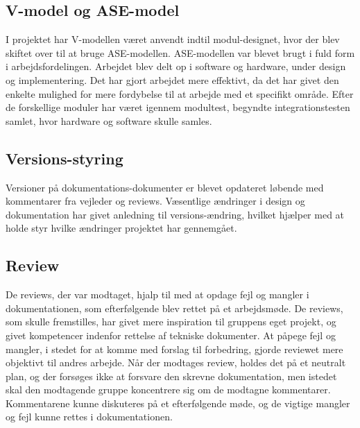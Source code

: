 \subsection{V-model og ASE-model}
I projektet har V-modellen\cite{lib:Projektoplaeg} været anvendt indtil modul-designet, hvor der blev skiftet over til at bruge ASE-modellen. 
ASE-modellen var blevet brugt i fuld form i arbejdsfordelingen. Arbejdet blev delt op i software og hardware, under design og implementering. Det har gjort arbejdet mere effektivt, da det har givet den enkelte mulighed for mere fordybelse til at arbejde med et specifikt område. Efter de forskellige moduler har været igennem modultest, begyndte integrationstesten samlet, hvor hardware og software skulle samles.

\subsection{Versions-styring}
Versioner på dokumentations-dokumenter er blevet opdateret løbende med kommentarer fra vejleder og reviews. Væsentlige ændringer i design og dokumentation har givet anledning til versions-ændring, hvilket hjælper med at holde styr hvilke ændringer projektet har gennemgået.

\subsection{Review}
De reviews\cite{lib:Review1}\cite{lib:Review2}, der var modtaget, hjalp til med at opdage fejl og mangler i dokumentationen, som efterfølgende blev rettet på et arbejdsmøde. 
De reviews, som skulle fremstilles, har givet mere inspiration til gruppens eget projekt, og givet kompetencer indenfor rettelse af tekniske dokumenter. At påpege fejl og mangler, i stedet for at komme med forslag til forbedring, gjorde reviewet mere objektivt til andres arbejde. Når der modtages review, holdes det på et neutralt plan, og der forsøges ikke at forsvare den skrevne dokumentation, men istedet skal den modtagende gruppe koncentrere sig om de modtagne kommentarer. Kommentarene kunne diskuteres på et efterfølgende møde, og de vigtige mangler og fejl kunne rettes i dokumentationen.

